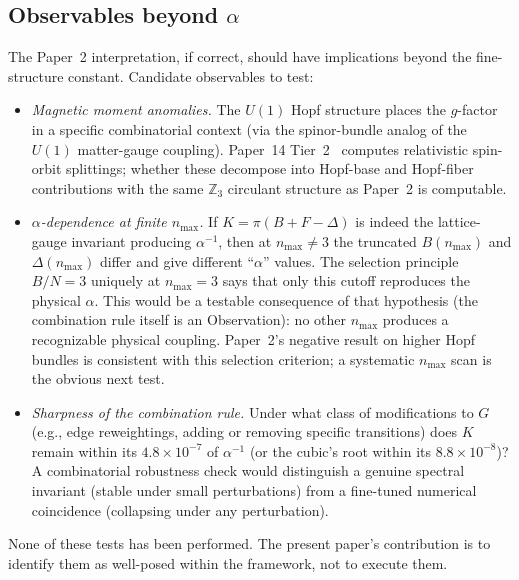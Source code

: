 \documentclass[aps,pra,twocolumn,superscriptaddress,longbibliography]{revtex4-2}
\begin{document}
\subsection{Observables beyond $\alpha$}

The Paper~2 interpretation, if correct, should have implications
beyond the fine-structure constant.  Candidate observables to test:
\begin{itemize}
\item \emph{Magnetic moment anomalies.}  The $U(1)$ Hopf structure
  places the $g$-factor in a specific combinatorial context (via
  the spinor-bundle analog of the $U(1)$ matter-gauge coupling).
  Paper~14 Tier~2~\cite{Paper14} computes relativistic spin-orbit
  splittings; whether these decompose into Hopf-base and
  Hopf-fiber contributions with the same $\mathbb{Z}_3$ circulant
  structure as Paper~2 is computable.
\item \emph{$\alpha$-dependence at finite $n_{\max}$.}  If
  $K = \pi(B + F - \Delta)$ is indeed the lattice-gauge invariant
  producing $\alpha^{-1}$, then at $n_{\max} \neq 3$ the truncated
  $B(n_{\max})$ and $\Delta(n_{\max})$ differ and give different
  ``$\alpha$'' values.  The selection principle $B/N = 3$
  uniquely at $n_{\max} = 3$ says that only this cutoff reproduces
  the physical $\alpha$.  This would be a testable consequence of that
  hypothesis (the combination rule itself is an Observation): no other
  $n_{\max}$ produces a recognizable physical coupling.  Paper~2's
  negative result on higher Hopf bundles is consistent with this
  selection criterion; a systematic $n_{\max}$ scan is the obvious
  next test.
\item \emph{Sharpness of the combination rule.}  Under what class of
  modifications to $G$ (e.g., edge reweightings, adding or removing
  specific transitions) does $K$ remain within its $4.8\times10^{-7}$
  of $\alpha^{-1}$ (or the cubic's root within its $8.8\times10^{-8}$)?  A combinatorial robustness check would distinguish
  a genuine spectral invariant (stable under small perturbations)
  from a fine-tuned numerical coincidence (collapsing under any
  perturbation).
\end{itemize}
None of these tests has been performed.  The present paper's
contribution is to identify them as well-posed within the framework,
not to execute them.

\end{document}
